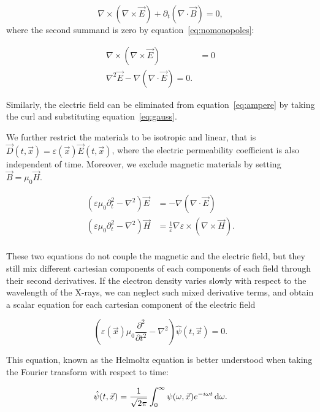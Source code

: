 \begin{equation}
    \nabla \times (\nabla \times \vec{E}) + \partial_t(\nabla \cdot \vec{B}) = 0,
    \label{}
\end{equation}
where the second summand is zero by equation~\eqref{eq:nomonopoles}:

\begin{align}
    \nabla \times (\nabla \times \vec{E}) &= 0\\
    \nabla^2 \vec{E} - \nabla (\nabla \cdot \vec{E}) = 0.
    \label{}
\end{align}

Similarly, the electric field can be eliminated from
equation~\eqref{eq:ampere} by taking the curl and substituting
equation~\eqref{eq:gauss}.

We further restrict the materials to be isotropic and linear, that is
$\vec{D}(t, \vec{x}) = \varepsilon(\vec{x}) \vec{E}(t, \vec{x})$, where the
electric permeability coefficient is also independent of time. Moreover, we
exclude magnetic materials by setting $\vec{B} = \mu_0 \vec{H}$.

\begin{align*}
    \left(\varepsilon \mu_0 \partial^2_t - \nabla^2 \right)
    \vec{E} &= - \nabla(\nabla \cdot \vec{E}) \\
    \left(\varepsilon \mu_0 \partial^2_t - \nabla^2 \right)
    \vec{H} &= \frac{1}{\varepsilon}\nabla \varepsilon \times (\nabla \times
    \vec{H}).\\
\end{align*}

These two equations do not couple the magnetic and the electric field, but
they still mix different cartesian components of each components of each
field through their second derivatives. If the electron density varies slowly
with respect to the wavelength of the X-rays, we can neglect such mixed
derivative terms, and obtain a scalar equation for each cartesian component
of the electric field

\begin{equation}
    \left( \varepsilon(\vec{x}) \mu_0 \frac{\partial^2}{\partial t^2} - \nabla^2
    \right) \hat{\psi}(t, \vec{x}) = 0.\label{eq:helmoltz.spacetime}
\end{equation}

This equation, known as the Helmoltz equation is better understood when
taking the Fourier transform with respect to time:

\begin{equation*}
    \hat{\psi}(t, \vec{x}) =
    \frac{1}{\sqrt{2\pi}}\int_{0}^{\infty}\psi(\omega, \vec{x})
    e^{-i \omega t} \operatorname{d}\!{\omega}.
\end{equation*}

